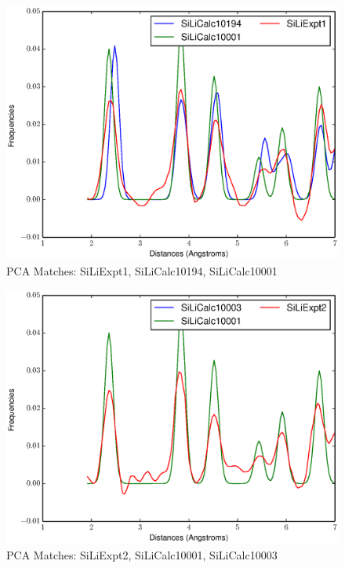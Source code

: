 \documentclass[12pt,letterpaper]{article}
\begin{document}
\begin{figure}[ht]
\begin{center}
\includegraphics[scale=0.8]{figs/PC128MatchSiLiExpt1-SiLiCalc10194-SiLiCalc10001.eps}
\caption{PCA Matches: SiLiExpt1, SiLiCalc10194, SiLiCalc10001}
\end{center}
\end{figure}

\begin{figure}[ht]
\begin{center}
\includegraphics[scale=0.8]{figs/PC128MatchSiLiExpt2-SiLiCalc10001-SiLiCalc10003.eps}
\caption{PCA Matches: SiLiExpt2, SiLiCalc10001, SiLiCalc10003}
\end{center}
\end{figure}
\end{document}
